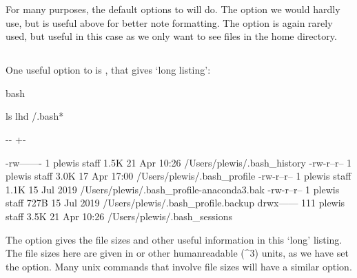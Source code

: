 \documentclass[letterpaper,10pt,english]{sphinxmanual}
\newlength\nbsphinxcodecellspacing
\begin{document}
For many purposes, the default options to  will do. The  option we would hardly use, but is useful above for better note formatting. The  option is again rarely used, but useful in this case as we only want to see files in the home directory.


\subsection{}
\label{\detokenize{Appendix1:ls--l}}
One useful option to  is , that gives ‘long listing’:

{
\begin{sphinxVerbatim}[commandchars=\\\{\}]
\llap{\color{nbsphinxin}[10]:\,\hspace{\fboxrule}\hspace{\fboxsep}}\PYGZpc{}\PYGZpc{}bash

ls \PYGZhy{}lhd  \PYGZti{}/.bash*
\end{sphinxVerbatim}
}

{

\kern-\sphinxverbatimsmallskipamount\kern-\baselineskip
\kern+\FrameHeightAdjust\kern-\fboxrule
\vspace{\nbsphinxcodecellspacing}

\begin{sphinxVerbatim}[commandchars=\\\{\}]
-rw-------    1 plewis  staff   1.5K 21 Apr 10:26 /Users/plewis/.bash\_history
-rw-r--r--    1 plewis  staff   3.0K 17 Apr 17:00 /Users/plewis/.bash\_profile
-rw-r--r--    1 plewis  staff   1.1K 15 Jul  2019 /Users/plewis/.bash\_profile-anaconda3.bak
-rw-r--r--    1 plewis  staff   727B 15 Jul  2019 /Users/plewis/.bash\_profile.backup
drwx------  111 plewis  staff   3.5K 21 Apr 10:26 /Users/plewis/.bash\_sessions
\end{sphinxVerbatim}
}

The  option gives the file sizes and other useful information in this ‘long’ listing. The file sizes here are given in  or other human\sphinxhyphen{}readable (\textasciicircum{}3) units, as we have set the  option. Many unix commands that involve file sizes will have a similar  option.
\end{document}
